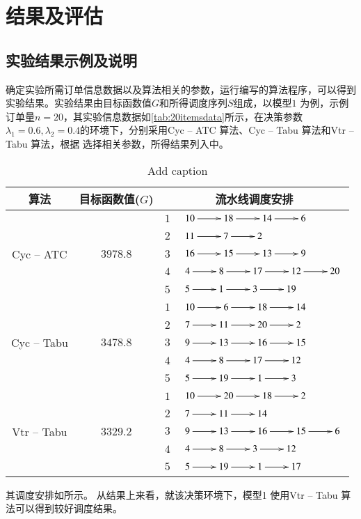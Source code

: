 \section{结果及评估}
\subsection{实验结果示例及说明}
确定实验所需订单信息数据以及算法相关的参数，运行编写的算法程序，可以得到实验结果。实验结果由目标函数值$G$和所得调度序列$S$组成，以模型$1$ 为例，示例订单量$n = 20$，其实验信息数据如\ref{tab:20itemsdata}所示，在决策参数$\lambda_1 = 0.6, \lambda_2 = 0.4$的环境下，分别采用Cyc -- ATC 算法、Cyc -- Tabu 算法和Vtr -- Tabu 算法，根据 选择相关参数，所得结果列入中。
\begin{table}[htbp]
  \centering
  \caption{Add caption}
    \begin{tabular}{cccl}
    \toprule
    算法    & 目标函数值($G$) & \multicolumn{2}{c}{流水线调度安排} \\
    \midrule
    \multirow{5}[2]{*}{Cyc -- ATC} & \multirow{5}[2]{*}{$3978.8$} & $1$     &$\xymatrix{10 \ar[r] & 18 \ar[r] & 14 \ar[r] & 6}$\\
          &       & $2$     &  $\xymatrix{11 \ar[r] & 7 \ar[r] & 2}$\\
          &       & $3$     &  $\xymatrix{16 \ar[r] & 15 \ar[r] & 13 \ar[r] & 9}$\\
          &       & $4$     &  $\xymatrix{4 \ar[r] & 8 \ar[r] & 17 \ar[r] & 12 \ar[r]&20}$\\
          &       & $5$     &  $\xymatrix{5 \ar[r] & 1 \ar[r] & 3 \ar[r] & 19}$\\
     \hline
    \multirow{5}[2]{*}{Cyc -- Tabu} & \multirow{5}[2]{*}{$3478.8$} & $1$     &  $\xymatrix{10 \ar[r] & 6 \ar[r] & 18 \ar[r] & 14}$\\
          &       & $2$     & $\xymatrix{7 \ar[r] & 11 \ar[r] & 20 \ar[r] & 2}$ \\
          &       & $3$     &  $\xymatrix{9 \ar[r] & 13 \ar[r] & 16 \ar[r] & 15}$\\
          &       & $4$     &  $\xymatrix{4 \ar[r] & 8 \ar[r] & 17 \ar[r] & 12}$\\
          &       & $5$     &  $\xymatrix{5 \ar[r] & 19 \ar[r] & 1 \ar[r] & 3}$\\
       \hline
    \multirow{5}[2]{*}{Vtr -- Tabu} & \multirow{5}[2]{*}{$3329.2$} & $1$     &  $\xymatrix{10 \ar[r] & 20 \ar[r] & 18 \ar[r] & 2}$\\
          &       & $2$     & $\xymatrix{7 \ar[r] & 11 \ar[r] & 14 }$ \\
          &       & $3$     &  $\xymatrix{9 \ar[r] & 13 \ar[r] & 16 \ar[r] & 15\ar[r]&6}$\\
          &       & $4$     &  $\xymatrix{4\ar[r] & 8 \ar[r] & 3 \ar[r] & 12}$\\
          &       & $5$     &  $\xymatrix{5 \ar[r] & 19 \ar[r] & 1 \ar[r] & 17}$\\
    \bottomrule
    \end{tabular}%
  \label{tab:addlabel}%
\end{table}%
其调度安排如所示。
%
从结果上来看，就该决策环境下，模型1 使用Vtr -- Tabu 算法可以得到较好调度结果。
